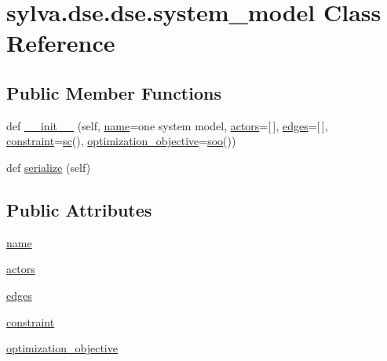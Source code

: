 \hypertarget{classsylva_1_1dse_1_1dse_1_1system__model}{}\section{sylva.\+dse.\+dse.\+system\+\_\+model Class Reference}
\label{classsylva_1_1dse_1_1dse_1_1system__model}
\subsection*{Public Member Functions}
\begin{DoxyCompactItemize}
\item 
def \hyperlink{classsylva_1_1dse_1_1dse_1_1system__model_a1d139488c7dc335da838c976cd35f748}{\+\_\+\+\_\+init\+\_\+\+\_\+} (self, \hyperlink{classsylva_1_1dse_1_1dse_1_1system__model_a8b435a2014aa563c8cb50ce7d91dfdc8}{name}=\textquotesingle{}one system model\textquotesingle{}, \hyperlink{classsylva_1_1dse_1_1dse_1_1system__model_a5ca9bb6295d4575df249f2f3326721a2}{actors}=\mbox{[}$\,$\mbox{]}, \hyperlink{classsylva_1_1dse_1_1dse_1_1system__model_a73a36bb2c1ddb4fa3558e4a5887decaa}{edges}=\mbox{[}$\,$\mbox{]}, \hyperlink{classsylva_1_1dse_1_1dse_1_1system__model_a3275b1b0df6c3c2d16668210db33e644}{constraint}=\hyperlink{namespacesylva_1_1dse_1_1dse_ac2d9fdcc3f7fd0bad1900fa0a813dff4}{sc}(), \hyperlink{classsylva_1_1dse_1_1dse_1_1system__model_acdb0fd58cbe5281c46488bd3981edc19}{optimization\+\_\+objective}=\hyperlink{namespacesylva_1_1dse_1_1dse_ab54fbae03bc2c432fecd4486e623af71}{soo}())
\item 
def \hyperlink{classsylva_1_1dse_1_1dse_1_1system__model_abdbd324e6d87f3baef25aeab12444edc}{serialize} (self)
\end{DoxyCompactItemize}
\subsection*{Public Attributes}
\begin{DoxyCompactItemize}
\item 
\hyperlink{classsylva_1_1dse_1_1dse_1_1system__model_a8b435a2014aa563c8cb50ce7d91dfdc8}{name}
\item 
\hyperlink{classsylva_1_1dse_1_1dse_1_1system__model_a5ca9bb6295d4575df249f2f3326721a2}{actors}
\item 
\hyperlink{classsylva_1_1dse_1_1dse_1_1system__model_a73a36bb2c1ddb4fa3558e4a5887decaa}{edges}
\item 
\hyperlink{classsylva_1_1dse_1_1dse_1_1system__model_a3275b1b0df6c3c2d16668210db33e644}{constraint}
\item 
\hyperlink{classsylva_1_1dse_1_1dse_1_1system__model_acdb0fd58cbe5281c46488bd3981edc19}{optimization\+\_\+objective}
\end{DoxyCompactItemize}


